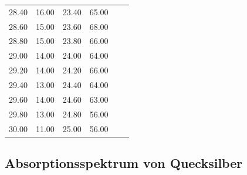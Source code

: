 \begin{table}
\begin{tabular}{c c | c c | c c}
    28.40 & 16.00 & 23.40 & 65.00 & & \\
    28.60 & 15.00 & 23.60 & 68.00 & & \\
    28.80 & 15.00 & 23.80 & 66.00 & & \\
    29.00 & 14.00 & 24.00 & 64.00 & & \\
    29.20 & 14.00 & 24.20 & 66.00 & & \\
    29.40 & 13.00 & 24.40 & 64.00 & & \\
    29.60 & 14.00 & 24.60 & 63.00 & & \\
    29.80 & 13.00 & 24.80 & 56.00 & & \\
    30.00 & 11.00 & 25.00 & 56.00 & & \\
    \bottomrule
  \end{tabular} %
\end{table}


\subsection{Absorptionsspektrum von Quecksilber}


